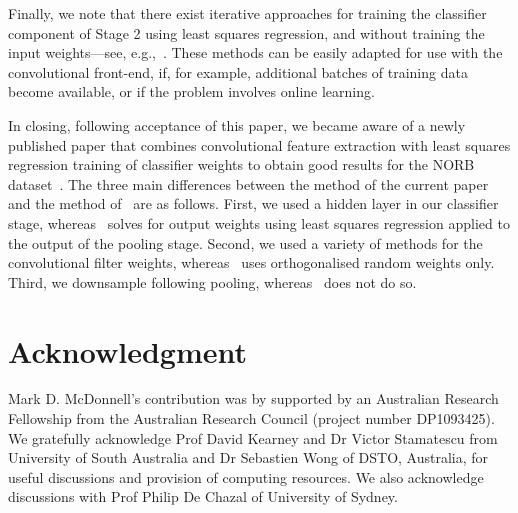 \documentclass[conference]{IEEEtran}
\begin{document}
Finally, we note that there exist iterative approaches for training the classifier component of Stage 2 using least squares regression, and without training the input weights---see, e.g.,~\cite{Tapson.13,Widrow.13,McDonnell.15PLOS}. These methods can be easily adapted for use with the convolutional front-end, if, for example,  additional batches of training data become available, or if the problem involves online learning. 

In closing, following acceptance of this paper, we became aware of a newly published paper that combines convolutional feature extraction with least squares regression training of classifier weights to obtain good results for the NORB dataset~\cite{Huang.15}. The three main differences between the method of the current paper and the method of~\cite{Huang.15} are as follows. First, we used a hidden layer in our classifier stage, whereas~\cite{Huang.15} solves for output weights using least squares regression  applied to  the output of the pooling stage. Second, we used a variety of methods for the convolutional filter weights, whereas~\cite{Huang.15} uses orthogonalised random weights only.  Third, we downsample following pooling, whereas~\cite{Huang.15} does not do so.  


\section*{Acknowledgment}


Mark D. McDonnell's contribution was by supported by an Australian Research Fellowship from the Australian Research Council (project number DP1093425).  We gratefully acknowledge Prof David Kearney and Dr Victor  Stamatescu from University of South Australia and Dr Sebastien Wong of DSTO, Australia, for useful discussions and provision of computing resources. We also acknowledge discussions with Prof Philip De Chazal of University of Sydney. 
\end{document}
